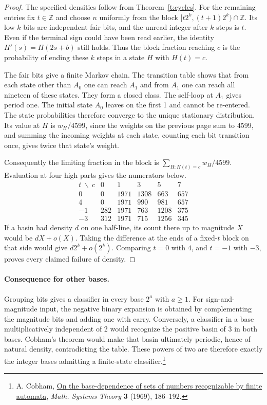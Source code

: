 \documentclass[11pt,a4paper]{article}
\newcommand{\Z}{\mathbb Z}
\begin{document}
\begin{proof}
The specified densities follow from Theorem~\ref{t:cycles}. For the remaining entries fix $t\in\Z$ and choose $n$ uniformly from the block $[t2^k,(t+1)2^k)\cap\Z$. Its low $k$ bits are independent fair bits, and the unread integer after $k$ steps is $t$. Even if the terminal sign could have been read earlier, the identity $H'(s)=H(2s+b)$ still holds. Thus the block fraction reaching $c$ is the probability of ending these $k$ steps in a state $H$ with $H(t)=c$.

The fair bits give a finite Markov chain. The transition table shows that from each state other than $A_0$ one can reach $A_1$ and from $A_1$ one can reach all nineteen of these states. They form a closed class. The self-loop at $A_1$ gives period one. The initial state $A_0$ leaves on the first 1 and cannot be re-entered. The state probabilities therefore converge to the unique stationary distribution. Its value at $H$ is $w_H/4599$, since the weights on the previous page sum to 4599, and summing the incoming weights at each state, counting each bit transition once, gives twice that state's weight.

Consequently the limiting fraction in the block is $\sum_{H:H(t)=c} w_H/4599$. Evaluation at four high parts gives the numerators below.
\[
\begin{array}{r|rrrrr}
 t\ \backslash\ c &0&1&3&5&7\\ \hline
 0 &0&1971&1308&663&657\\
 4 &0&1971&990&981&657\\
 -1&282&1971&763&1208&375\\
 -3&312&1971&715&1256&345
\end{array}
\]
If a basin had density $d$ on one half-line, its count there up to magnitude $X$ would be $dX+o(X)$. Taking the difference at the ends of a fixed-$t$ block on that side would give $d2^k+o(2^k)$. Comparing $t=0$ with $4$, and $t=-1$ with $-3$, proves every claimed failure of density.
\end{proof}

\paragraph{Consequence for other bases.}
Grouping bits gives a classifier in every base $2^a$ with $a\ge1$. For sign-and-magnitude input, the negative binary expansion is obtained by complementing the magnitude bits and adding one with carry. Conversely, a classifier in a base multiplicatively independent of 2 would recognize the positive basin of 3 in both bases. Cobham's theorem would make that basin ultimately periodic, hence of natural density, contradicting the table. These powers of two are therefore exactly the integer bases admitting a finite-state classifier.\footnote{A. Cobham, \href{https://doi.org/10.1007/BF01746527}{On the base-dependence of sets of numbers recognizable by finite automata}, \emph{Math. Systems Theory} \textbf{3} (1969), 186--192.}
\end{document}
